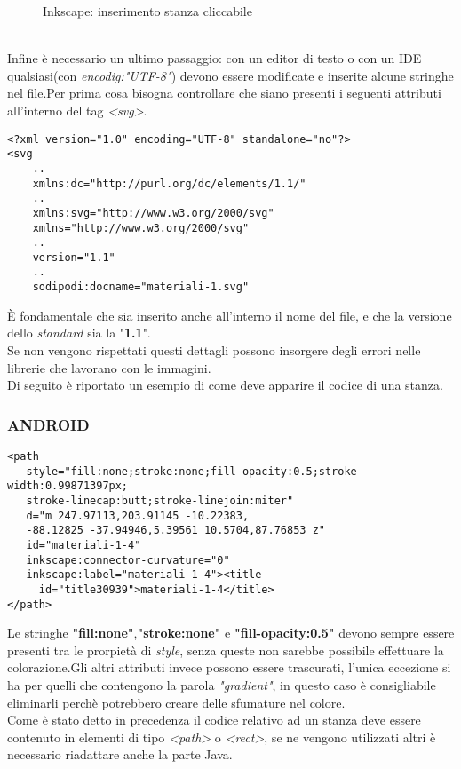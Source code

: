 \begin{figure}[H]
\centering
{}
\caption{Inkscape: inserimento stanza cliccabile}
\label{fig:TUT_ink}%
\end{figure}
\noindent\\Infine \`e necessario un ultimo passaggio: con un editor di testo o con un IDE qualsiasi(con \textit{encodig:"UTF-8"}) devono essere modificate e inserite alcune stringhe nel file.Per prima cosa bisogna controllare che siano presenti i seguenti attributi all'interno del tag \textit{<svg>}.
\begin{lstlisting}
<?xml version="1.0" encoding="UTF-8" standalone="no"?>
<svg
	..
	xmlns:dc="http://purl.org/dc/elements/1.1/"
	..
	xmlns:svg="http://www.w3.org/2000/svg"
	xmlns="http://www.w3.org/2000/svg"
	..
	version="1.1"
	..
	sodipodi:docname="materiali-1.svg"
\end{lstlisting}
\`E fondamentale che sia inserito anche all'interno il nome del file, e che la versione dello \textit{standard} sia la "\textbf{1.1}".\\Se non vengono rispettati questi dettagli possono insorgere degli errori nelle librerie che lavorano con le immagini.\\Di seguito \`e riportato un esempio di come deve apparire il codice di una stanza.
\subsubsection*{ANDROID}
\begin{lstlisting}
<path
   style="fill:none;stroke:none;fill-opacity:0.5;stroke-width:0.99871397px;
   stroke-linecap:butt;stroke-linejoin:miter"
   d="m 247.97113,203.91145 -10.22383,
   -88.12825 -37.94946,5.39561 10.5704,87.76853 z"
   id="materiali-1-4"
   inkscape:connector-curvature="0"
   inkscape:label="materiali-1-4"><title
     id="title30939">materiali-1-4</title>
</path>
\end{lstlisting}
Le stringhe \textbf{"fill:none"},\textbf{"stroke:none"} e \textbf{"fill-opacity:0.5"} devono sempre essere presenti tra le prorpiet\`a di \textit{style}, senza queste non sarebbe possibile effettuare la colorazione.Gli altri attributi invece possono essere trascurati, l'unica eccezione si ha per quelli che contengono la parola \textit{"gradient"}, in questo caso \`e consigliabile eliminarli perch\`e potrebbero creare delle sfumature nel colore.\\Come \`e stato detto in precedenza il codice relativo ad un stanza deve essere contenuto in elementi di tipo \textit{<path>} o \textit{<rect>}, se ne vengono utilizzati altri \`e necessario riadattare anche la parte Java.
